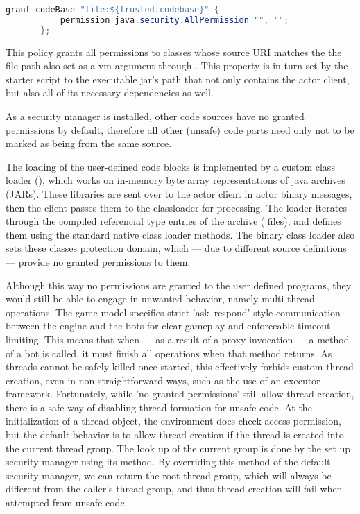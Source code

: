 			\begin{center}
				\begin{minipage}{11cm}
					\begin{lstlisting}[language=Java, title={\code{client.policy}}]
	   grant codeBase "file:${trusted.codebase}" {
		   permission java.security.AllPermission "", "";
	   };
					\end{lstlisting}
				\end{minipage}
			\end{center}
		
			This policy grants all permissions to classes whose source URI matches the the file path also set as a vm argument through . This property is in turn set by the starter script to the executable jar's path that not only contains the actor client, but also all of its necessary dependencies as well.
			
			As a security manager is installed, other code sources have no granted permissions by default, therefore all other (unsafe) code parts need only not to be marked as being from the same source.
			
			The loading of the user-defined code blocks is implemented by a custom class loader (), which works on in-memory byte array representations of java archives (JARs). These libraries are sent over to the actor client in actor binary messages, then the client passes them to the classloader for processing. The loader iterates through the compiled referencial type entries of the archive ( files), and defines them using the standard native class loader methods. The binary class loader also sets these classes protection domain, which --- due to different source definitions --- provide no granted permissions to them.
			
			Although this way no permissions are granted to the user defined programs, they would still be able to engage in unwanted behavior, namely multi-thread operations. The game model specifies strict 'ask--respond' style communication between the engine and the bots for clear gameplay and enforceable timeout limiting. This means that when --- as a result of a proxy invocation --- a method of a bot is called, it must finish all operations when that method returns. As threads cannot be safely killed once started, this effectively forbids custom thread creation, even in non-straightforward ways, such as the use of an executor framework. Fortunately, while 'no granted permissions' still allow thread creation, there is a safe way of disabling thread formation for unsafe code. At the initialization of a thread object, the environment does check access permission, but the default behavior is to allow thread creation if the thread is created into the current thread group. The look up of the current group is done by the set up security manager using its  method. By overriding this method of the default security manager, we can return the root thread group, which will always be different from the caller's thread group, and thus thread creation will fail when attempted from unsafe code.
			
